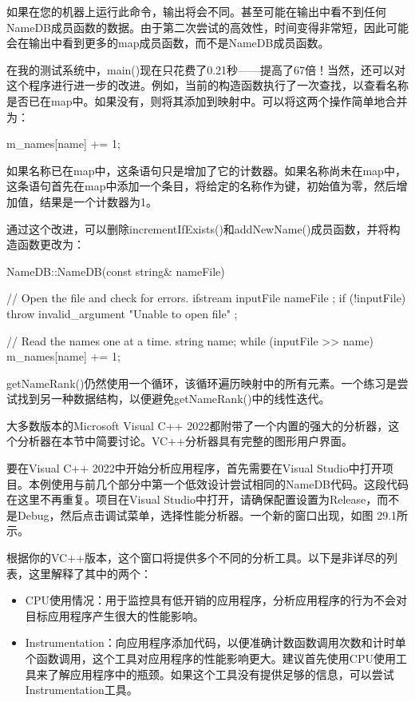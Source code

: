 如果在您的机器上运行此命令，输出将会不同。甚至可能在输出中看不到任何NameDB成员函数的数据。由于第二次尝试的高效性，时间变得非常短，因此可能会在输出中看到更多的map成员函数，而不是NameDB成员函数。

在我的测试系统中，main()现在只花费了0.21秒——提高了67倍！当然，还可以对这个程序进行进一步的改进。例如，当前的构造函数执行了一次查找，以查看名称是否已在map中。如果没有，则将其添加到映射中。可以将这两个操作简单地合并为：

\begin{cpp}
m_names[name] += 1;
\end{cpp}

如果名称已在map中，这条语句只是增加了它的计数器。如果名称尚未在map中，这条语句首先在map中添加一个条目，将给定的名称作为键，初始值为零，然后增加值，结果是一个计数器为1。

通过这个改进，可以删除incrementIfExists()和addNewName()成员函数，并将构造函数更改为：

\begin{cpp}
NameDB::NameDB(const string& nameFile)
{
    // Open the file and check for errors.
    ifstream inputFile { nameFile };
    if (!inputFile) {
        throw invalid_argument { "Unable to open file" };
    }

    // Read the names one at a time.
    string name;
    while (inputFile >> name) {
        m_names[name] += 1;
    }
}
\end{cpp}

getNameRank()仍然使用一个循环，该循环遍历映射中的所有元素。一个练习是尝试找到另一种数据结构，以便避免getNameRank()中的线性迭代。


大多数版本的Microsoft Visual C++ 2022都附带了一个内置的强大的分析器，这个分析器在本节中简要讨论。VC++分析器具有完整的图形用户界面。

要在Visual C++ 2022中开始分析应用程序，首先需要在Visual Studio中打开项目。本例使用与前几个部分中第一个低效设计尝试相同的NameDB代码。这段代码在这里不再重复。项目在Visual Studio中打开，请确保配置设置为Release，而不是Debug，然后点击调试菜单，选择性能分析器。一个新的窗口出现，如图 29.1所示。


根据你的VC++版本，这个窗口将提供多个不同的分析工具。以下是非详尽的列表，这里解释了其中的两个：

\begin{itemize}
\item
CPU使用情况：用于监控具有低开销的应用程序，分析应用程序的行为不会对目标应用程序产生很大的性能影响。

\item
Instrumentation：向应用程序添加代码，以便准确计数函数调用次数和计时单个函数调用，这个工具对应用程序的性能影响更大。建议首先使用CPU使用工具来了解应用程序中的瓶颈。如果这个工具没有提供足够的信息，可以尝试Instrumentation工具。
\end{itemize}

